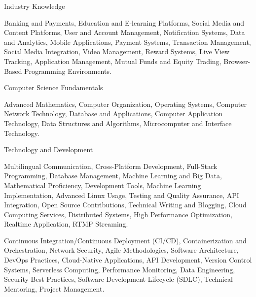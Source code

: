 

\begin{cventries}

  \cventry
    {Industry Knowledge} %
    {} %
    {} %
    {} %
    {
      \begin{cvitems}
        \item {Banking and Payments, Education and E-learning Platforms, Social Media and Content Platforms, User and Account Management, Notification Systems, Data and Analytics, Mobile Applications, Payment Systems, Transaction Management, Social Media Integration, Video Management, Reward Systems, Live View Tracking, Application Management, Mutual Funds and Equity Trading, Browser-Based Programming Environments.}
      \end{cvitems}
    }

  \cventry
    {Computer Science Fundamentals} %
    {} %
    {} %
    {} %
    {
      \begin{cvitems}
        \item {Advanced Mathematics, Computer Organization, Operating Systems, Computer Network Technology, Database and Applications, Computer Application Technology, Data Structures and Algorithms, Microcomputer and Interface Technology.}
      \end{cvitems}
    }

  \cventry
    {Technology and Development} %
    {} %
    {} %
    {} %
    {
      \begin{cvitems}
        \item {Multilingual Communication, Cross-Platform Development, Full-Stack Programming, Database Management, Machine Learning and Big Data, Mathematical Proficiency, Development Tools, Machine Learning Implementation, Advanced Linux Usage, Testing and Quality Assurance, API Integration, Open Source Contributions, Technical Writing and Blogging, Cloud Computing Services, Distributed Systems, High Performance Optimization, Realtime Application, RTMP Streaming.}
        \item {Continuous Integration/Continuous Deployment (CI/CD), Containerization and Orchestration, Network Security, Agile Methodologies, Software Architecture, DevOps Practices, Cloud-Native Applications, API Development, Version Control Systems, Serverless Computing, Performance Monitoring, Data Engineering, Security Best Practices, Software Development Lifecycle (SDLC), Technical Mentoring, Project Management.}
      \end{cvitems}
    }

\end{cventries}
